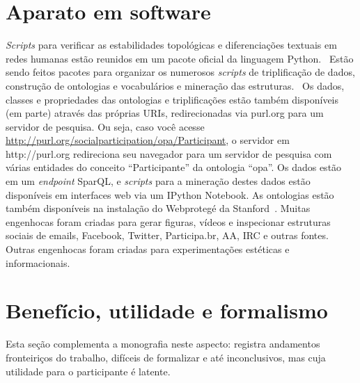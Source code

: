 \documentclass[a4paper,openright,12pt]{report} %
\begin{document}
\section{Aparato em software}
\emph{Scripts} para verificar as estabilidades topológicas e diferenciações textuais em redes humanas estão reunidos em um pacote oficial da linguagem Python.~\cite{gmanePack}
Estão sendo feitos pacotes para organizar os numerosos \emph{scripts}
de triplificação de dados, construção de ontologias e vocabulários e mineração das
estruturas.~\cite{participation, percolation} 
Os dados, classes e propriedades das
ontologias e triplificações estão também disponíveis (em parte)
através das próprias URIs, redirecionadas via purl.org
para um servidor de pesquisa. Ou seja,
caso você acesse \url{http://purl.org/socialparticipation/opa/Participant},
o servidor em http://purl.org redireciona seu navegador para
um servidor de pesquisa com várias entidades do conceito ``Participante''
da ontologia ``opa''.
Os dados estão em um \emph{endpoint} SparQL, e \emph{scripts} para a mineração
destes dados estão disponíveis em interfaces web via um
IPython Notebook. As ontologias estão também disponíveis
na instalação do Webprotegé da Stanford~\cite{pnud5}.
Muitas engenhocas foram criadas para gerar figuras, vídeos e inspecionar
estruturas sociais de emails, Facebook, Twitter, Participa.br, AA, IRC e outras
fontes.~\cite{appGMANE,social,ensaaio,ensaio}
Outras engenhocas foram criadas para experimentações estéticas e
informacionais.~\cite{mmissa,ocupagov,gmanePack,mm}

\section{Benefício, utilidade e formalismo}
Esta seção complementa a monografia neste aspecto:
registra andamentos fronteiriços do trabalho, difíceis de formalizar e até inconclusivos,
mas cuja utilidade para o participante é latente.
\end{document}
